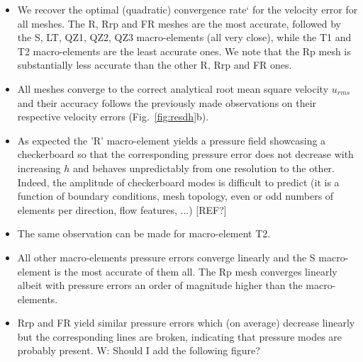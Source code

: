\documentclass[a4paper,12pt]{article}
\begin{document}
\begin{itemize}

\item We recover the optimal (quadratic) convergence rate` for the velocity error for all meshes.
The R, Rrp and FR meshes are the most accurate, followed by the S, LT, QZ1, QZ2, QZ3 macro-elements
(all very close), while the T1 and T2 macro-elements are the least accurate ones. 
We note that the Rp mesh is substantially less accurate than the other R, Rrp and FR ones.

\item All meshes converge to the correct analytical root mean square velocity $u_{rms}$ and 
their accuracy follows the previously made observations on their respective velocity errors
(Fig.~\ref{fig:resdh}b).

\item As expected the 'R' macro-element yields a pressure field showcasing a checkerboard so that 
the corresponding pressure error does not decrease with increasing $h$ and behaves unpredictably
from one resolution to the other. Indeed, the amplitude of checkerboard modes is difficult to predict (it is a function 
of boundary conditions, mesh topology, even or odd numbers of elements per direction, flow features, ...) [REF?] 
\item The same observation can be made for macro-element T2. 
\item All other macro-elements pressure errors converge linearly and the S macro-element is
the most accurate of them all.
The Rp mesh converges linearly albeit with pressure errors an order of magnitude higher than 
the macro-elements.
\item Rrp and FR yield similar pressure errors which (on average) decrease linearly but the corresponding 
lines are broken, indicating that pressure modes are probably present. 
{\color{blue} W: Should I add the following figure?}


\end{itemize}
\end{document}
